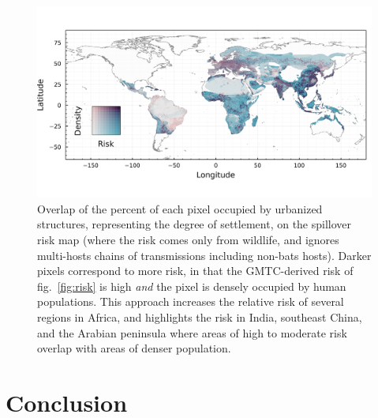 \documentclass[11pt]{article}
\makeatletter
\def\maxwidth{\ifdim\Gin@nat@width>\linewidth\linewidth
\else\Gin@nat@width\fi}
\let\Oldincludegraphics\includegraphics
\renewcommand{\includegraphics}[1]{\Oldincludegraphics[width=\maxwidth]{#1}}
\makeatother
\begin{document}
\begin{figure}
\hypertarget{fig:compound}{%
\centering
\includegraphics{figures/risk_compounded.png}
\caption{Overlap of the percent of each pixel occupied by urbanized
structures, representing the degree of settlement, on the spillover risk
map (where the risk comes only from wildlife, and ignores multi-hosts
chains of transmissions including non-bats hosts). Darker pixels
correspond to more risk, in that the GMTC-derived risk of
fig.~\ref{fig:risk} is high \emph{and} the pixel is densely occupied by
human populations. This approach increases the relative risk of several
regions in Africa, and highlights the risk in India, southeast China,
and the Arabian peninsula where areas of high to moderate risk overlap
with areas of denser population.}\label{fig:compound}
}
\end{figure}

\hypertarget{conclusion}{%
\section{Conclusion}\label{conclusion}}
\end{document}
